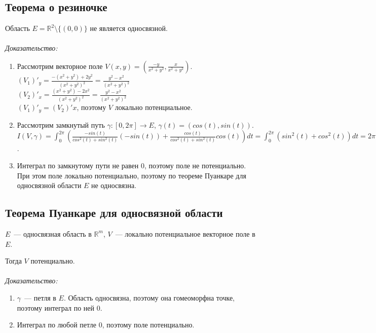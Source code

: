 \documentclass[paper=a4, fontsize=11pt]{article}
\begin{document}
\subsection{Теорема о резиночке}
Область $E = \mathds{R}^2 \setminus \{(0,0)\}$ не является односвязной.
\\\\
\emph{Доказательство:}
\begin{enumerate}
    \item Рассмотрим векторное поле $V(x,y) = (\frac{-y}{x^2+y^2},\frac{x}{x^2+y^2})$.\\
    $(V_1)'_y = \frac{-(x^2+y^2) + 2y^2}{(x^2+y^2)^2} = \frac{y^2-x^2}{(x^2+y^2)^2}$\\
    $(V_2)'_x = \frac{(x^2+y^2) - 2x^2}{(x^2+y^2)^2} = \frac{y^2-x^2}{(x^2+y^2)^2}$\\
    $(V_1)'_y = (V_2)'x$, поэтому $V$ локально потенциальное.
    \item Рассмотрим замкнутый путь $\gamma:[0,2\pi] \rightarrow E$, $\gamma(t) = (cos(t),sin(t))$.\\
    $I(V,\gamma) = \int_0^{2\pi} (\frac{-sin(t)}{cos^2(t)+sin^2(t)}(-sin(t)) + \frac{cos(t)}{cos^2(t)+sin^2(t)}cos(t)) dt =
    \int_0^{2\pi} (sin^2(t) + cos^2(t))dt = 2\pi \neq 0$.
    \item Интеграл по замкнутому пути не равен $0$, поэтому поле не потенциально. При этом поле локально потенциально,
    поэтому по теореме Пуанкаре для односвязной области $E$ не односвязна.
\end{enumerate}

\subsection{Теорема Пуанкаре для односвязной области}
$E$~--- односвязная область в $\mathds{R}^m$, $V$~--- локально потенциальное векторное поле в $E$.

Тогда $V$ потенциально.
\\\\
\emph{Доказательство:}
\begin{enumerate}
    \item $\gamma$~--- петля в $E$. Область односвязна, поэтому она гомеоморфна точке, поэтому интеграл по ней $0$.
    \item Интеграл по любой петле $0$, поэтому поле потенциально.
\end{enumerate}
\end{document}

